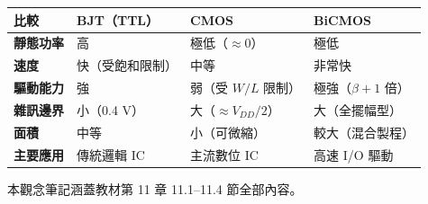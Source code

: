 \documentclass[12pt]{article}
\begin{document}
\bigskip

\begin{center}
\renewcommand{\arraystretch}{1.3}
\begin{tabular}{>{\bfseries}l p{3.1cm} p{3.1cm} p{3.1cm}}
\toprule
\textbf{比較} & \textbf{BJT（TTL）} & \textbf{CMOS} & \textbf{BiCMOS} \\
\midrule
靜態功率 & 高 & 極低（$\approx 0$） & 極低 \\
速度 & 快（受飽和限制） & 中等 & 非常快 \\
驅動能力 & 強 & 弱（受 $W/L$ 限制） & 極強（$\beta+1$ 倍）\\
雜訊邊界 & 小（0.4 V） & 大（$\approx V_{DD}/2$） & 大（全擺幅型）\\
面積 & 中等 & 小（可微縮） & 較大（混合製程）\\
主要應用 & 傳統邏輯 IC & 主流數位 IC & 高速 I/O 驅動 \\
\bottomrule
\end{tabular}
\end{center}

\vfill
\begin{center}
{\small\color{gray} 本觀念筆記涵蓋教材第 11 章 11.1--11.4 節全部內容。}
\end{center}
\end{document}
